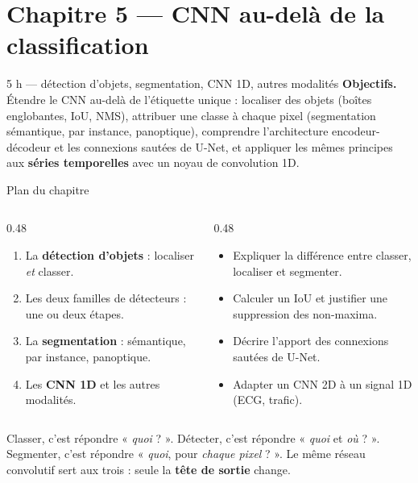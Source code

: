 \section{Chapitre 5 --- CNN au-delà de la classification}

%
{5 h --- détection d'objets, segmentation, CNN 1D, autres modalités}%
{\textbf{Objectifs.} Étendre le CNN au-delà de l'étiquette unique : localiser des objets
(boîtes englobantes, IoU, NMS), attribuer une classe à chaque pixel (segmentation sémantique,
par instance, panoptique), comprendre l'architecture encodeur-décodeur et les connexions
sautées de U-Net, et appliquer les mêmes principes aux \textbf{séries temporelles} avec un
noyau de convolution 1D.}

\begin{frame}{Plan du chapitre}
\begin{columns}[t]
\begin{column}{0.48\textwidth}
\begin{kbox}
\begin{enumerate}
  \item La \textbf{détection d'objets} : localiser \emph{et} classer.
  \item Les deux familles de détecteurs : une ou deux étapes.
  \item La \textbf{segmentation} : sémantique, par instance, panoptique.
  \item Les \textbf{CNN 1D} et les autres modalités.
\end{enumerate}
\end{kbox}
\end{column}
\begin{column}{0.48\textwidth}
\begin{ebox}
\begin{itemize}
  \item Expliquer la différence entre classer, localiser et segmenter.
  \item Calculer un IoU et justifier une suppression des non-maxima.
  \item Décrire l'apport des connexions sautées de U-Net.
  \item Adapter un CNN 2D à un signal 1D (ECG, trafic).
\end{itemize}
\end{ebox}
\end{column}
\end{columns}
\vspace{1mm}
\begin{wbox}
Classer, c'est répondre « \emph{quoi} ? ». Détecter, c'est répondre « \emph{quoi} et
\emph{où} ? ». Segmenter, c'est répondre « \emph{quoi}, pour \emph{chaque pixel} ? ».
Le même réseau convolutif sert aux trois : seule la \textbf{tête de sortie} change.
\end{wbox}
\end{frame}

